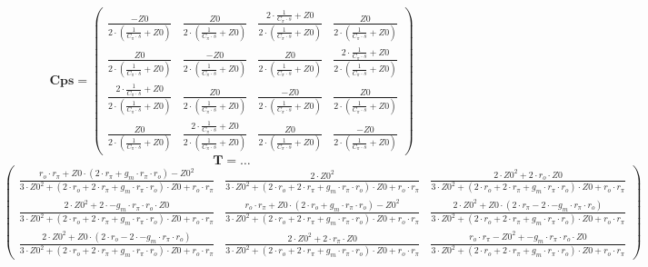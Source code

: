 \[ \mathbf{Cps}=\left(\begin{smallmatrix} \frac{-Z0}{2\cdot
\left(\frac{1}{C_{\pi}\cdot s}+Z0\right)} & \frac{Z0}{2\cdot
\left(\frac{1}{C_{\pi}\cdot s}+Z0\right)} & \frac{2\cdot
\frac{1}{C_{\pi}\cdot s}+Z0}{2\cdot \left(\frac{1}{C_{\pi}\cdot
s}+Z0\right)} & \frac{Z0}{2\cdot \left(\frac{1}{C_{\pi}\cdot
s}+Z0\right)} \\ \frac{Z0}{2\cdot \left(\frac{1}{C_{\pi}\cdot
s}+Z0\right)} & \frac{-Z0}{2\cdot \left(\frac{1}{C_{\pi}\cdot
s}+Z0\right)} & \frac{Z0}{2\cdot \left(\frac{1}{C_{\pi}\cdot
s}+Z0\right)} & \frac{2\cdot \frac{1}{C_{\pi}\cdot s}+Z0}{2\cdot
\left(\frac{1}{C_{\pi}\cdot s}+Z0\right)} \\ \frac{2\cdot
\frac{1}{C_{\pi}\cdot s}+Z0}{2\cdot \left(\frac{1}{C_{\pi}\cdot
s}+Z0\right)} & \frac{Z0}{2\cdot \left(\frac{1}{C_{\pi}\cdot
s}+Z0\right)} & \frac{-Z0}{2\cdot \left(\frac{1}{C_{\pi}\cdot
s}+Z0\right)} & \frac{Z0}{2\cdot \left(\frac{1}{C_{\pi}\cdot
s}+Z0\right)} \\ \frac{Z0}{2\cdot \left(\frac{1}{C_{\pi}\cdot
s}+Z0\right)} & \frac{2\cdot \frac{1}{C_{\pi}\cdot s}+Z0}{2\cdot
\left(\frac{1}{C_{\pi}\cdot s}+Z0\right)} & \frac{Z0}{2\cdot
\left(\frac{1}{C_{\pi}\cdot s}+Z0\right)} & \frac{-Z0}{2\cdot
\left(\frac{1}{C_{\pi}\cdot s}+Z0\right)} \end{smallmatrix}\right) \]
\[ \mathbf{T}=\ldots \]
\[ \left(\begin{smallmatrix} \frac{r_o\cdot r_{\pi}+Z0\cdot
\left(2\cdot r_{\pi}+g_m\cdot r_{\pi}\cdot r_o\right)-Z0^2}{3\cdot
Z0^2+\left(2\cdot r_o+2\cdot r_{\pi}+g_m\cdot r_{\pi}\cdot
r_o\right)\cdot Z0+r_o\cdot r_{\pi}} & \frac{2\cdot Z0^2}{3\cdot
Z0^2+\left(2\cdot r_o+2\cdot r_{\pi}+g_m\cdot r_{\pi}\cdot
r_o\right)\cdot Z0+r_o\cdot r_{\pi}} & \frac{2\cdot Z0^2+2\cdot
r_o\cdot Z0}{3\cdot Z0^2+\left(2\cdot r_o+2\cdot r_{\pi}+g_m\cdot
r_{\pi}\cdot r_o\right)\cdot Z0+r_o\cdot r_{\pi}} \\ \frac{2\cdot
Z0^2+2\cdot -g_m\cdot r_{\pi}\cdot r_o\cdot Z0}{3\cdot
Z0^2+\left(2\cdot r_o+2\cdot r_{\pi}+g_m\cdot r_{\pi}\cdot
r_o\right)\cdot Z0+r_o\cdot r_{\pi}} & \frac{r_o\cdot r_{\pi}+Z0\cdot
\left(2\cdot r_o+g_m\cdot r_{\pi}\cdot r_o\right)-Z0^2}{3\cdot
Z0^2+\left(2\cdot r_o+2\cdot r_{\pi}+g_m\cdot r_{\pi}\cdot
r_o\right)\cdot Z0+r_o\cdot r_{\pi}} & \frac{2\cdot Z0^2+Z0\cdot
\left(2\cdot r_{\pi}-2\cdot -g_m\cdot r_{\pi}\cdot r_o\right)}{3\cdot
Z0^2+\left(2\cdot r_o+2\cdot r_{\pi}+g_m\cdot r_{\pi}\cdot
r_o\right)\cdot Z0+r_o\cdot r_{\pi}} \\ \frac{2\cdot Z0^2+Z0\cdot
\left(2\cdot r_o-2\cdot -g_m\cdot r_{\pi}\cdot r_o\right)}{3\cdot
Z0^2+\left(2\cdot r_o+2\cdot r_{\pi}+g_m\cdot r_{\pi}\cdot
r_o\right)\cdot Z0+r_o\cdot r_{\pi}} & \frac{2\cdot Z0^2+2\cdot
r_{\pi}\cdot Z0}{3\cdot Z0^2+\left(2\cdot r_o+2\cdot r_{\pi}+g_m\cdot
r_{\pi}\cdot r_o\right)\cdot Z0+r_o\cdot r_{\pi}} & \frac{r_o\cdot
r_{\pi}-Z0^2+-g_m\cdot r_{\pi}\cdot r_o\cdot Z0}{3\cdot
Z0^2+\left(2\cdot r_o+2\cdot r_{\pi}+g_m\cdot r_{\pi}\cdot
r_o\right)\cdot Z0+r_o\cdot r_{\pi}} \end{smallmatrix}\right) \]
